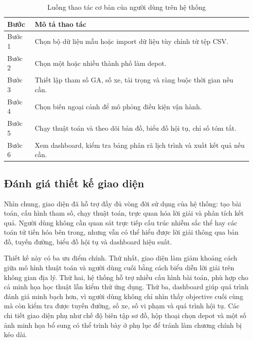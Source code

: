 \documentclass[12pt,a4paper]{article}
\numberwithin{figure}{subsection}
\numberwithin{table}{subsection}
\begin{document}
\begin{table}[htbp]
    \centering
    \caption{Luồng thao tác cơ bản của người dùng trên hệ thống}
    \label{tab:user_workflow}
    \renewcommand{\arraystretch}{1.24}
    \begin{tabular}{|p{3cm}|p{10.8cm}|}
        \hline
        \textbf{Bước} & \textbf{Mô tả thao tác} \\
        \hline
        Bước 1 & Chọn bộ dữ liệu mẫu hoặc import dữ liệu tùy chỉnh từ tệp CSV. \\
        \hline
        Bước 2 & Chọn một hoặc nhiều thành phố làm depot. \\
        \hline
        Bước 3 & Thiết lập tham số GA, số xe, tải trọng và ràng buộc thời gian nếu cần. \\
        \hline
        Bước 4 & Chọn biến ngoại cảnh để mô phỏng điều kiện vận hành. \\
        \hline
        Bước 5 & Chạy thuật toán và theo dõi bản đồ, biểu đồ hội tụ, chỉ số tóm tắt. \\
        \hline
        Bước 6 & Xem dashboard, kiểm tra bảng phân rã lịch trình và xuất kết quả nếu cần. \\
        \hline
    \end{tabular}
\end{table}

\subsection{Đánh giá thiết kế giao diện}

Nhìn chung, giao diện đã hỗ trợ đầy đủ vòng đời sử dụng của hệ thống: tạo bài toán, cấu hình tham số, chạy thuật toán, trực quan hóa lời giải và phân tích kết quả. Người dùng không cần quan sát trực tiếp cấu trúc nhiễm sắc thể hay các toán tử tiến hóa bên trong, nhưng vẫn có thể hiểu được lời giải thông qua bản đồ, tuyến đường, biểu đồ hội tụ và dashboard hiệu suất.

Thiết kế này có ba ưu điểm chính. Thứ nhất, giao diện làm giảm khoảng cách giữa mô hình thuật toán và người dùng cuối bằng cách biểu diễn lời giải trên không gian địa lý. Thứ hai, hệ thống hỗ trợ nhiều cấu hình bài toán, phù hợp cho cả minh họa học thuật lẫn kiểm thử ứng dụng. Thứ ba, dashboard giúp quá trình đánh giá minh bạch hơn, vì người dùng không chỉ nhìn thấy objective cuối cùng mà còn kiểm tra được tuyến đường, số xe, số vi phạm và quá trình hội tụ. Các chi tiết giao diện phụ như chế độ biên tập sơ đồ, hộp thoại chọn depot và một số ảnh minh họa bổ sung có thể trình bày ở phụ lục để tránh làm chương chính bị kéo dài.
\end{document}
